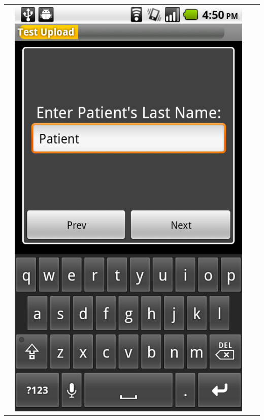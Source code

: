 \documentclass[a4paper,10pt]{article}
\begin{document}
\begin{flushleft}
\begin{tabular}{ c c c c }
&\includegraphics[scale=0.15,keepaspectratio=true]{client_proc_pt_last.png}

\end{tabular}
\end{flushleft}
\end{document}

